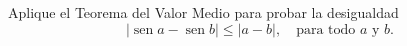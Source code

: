 \item Aplique el Teorema del Valor Medio para probar la desigualdad
    $$|\operatorname{sen} a - \operatorname{sen} b| \le |a - b|, \quad \text{para todo } a \text{ y } b.$$

